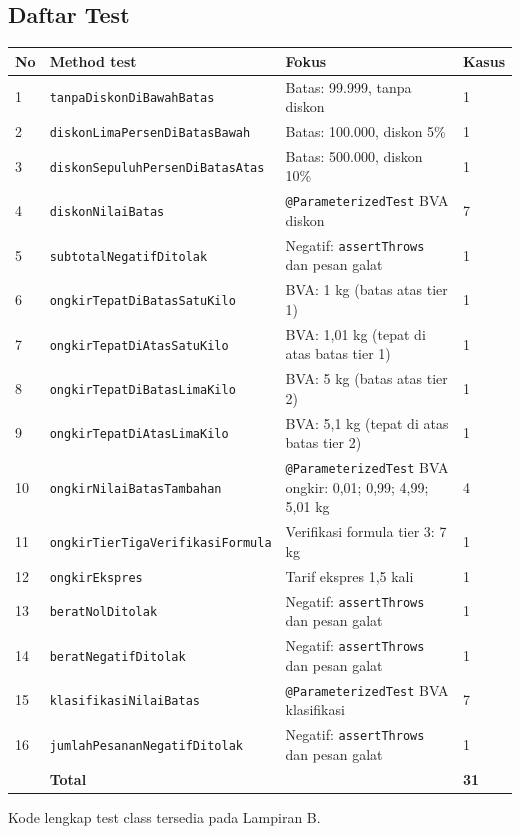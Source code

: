 \documentclass[11pt,a4paper]{article}
\newcommand{\hrow}{\rowcolor{headrow}}
\begin{document}
\subsection{Daftar Test}
\begin{center}
\small
\begin{tabularx}{\textwidth}{@{}P{0.8cm}P{5.7cm}YP{1.2cm}@{}}
\toprule
\hrow \textbf{No} & \textbf{Method test} & \textbf{Fokus} & \textbf{Kasus} \\
 & \texttt{tanpaDiskonDiBawahBatas} & Batas: 99.999, tanpa diskon & 1 \\
2 & \texttt{diskonLimaPersenDiBatasBawah} & Batas: 100.000, diskon 5\% & 1 \\
3 & \texttt{diskonSepuluhPersenDiBatasAtas} & Batas: 500.000, diskon 10\% & 1 \\
4 & \texttt{diskonNilaiBatas} & \texttt{@ParameterizedTest} BVA diskon & 7 \\
5 & \texttt{subtotalNegatifDitolak} & Negatif: \texttt{assertThrows} dan pesan galat & 1 \\
6 & \texttt{ongkirTepatDiBatasSatuKilo} & BVA: 1 kg (batas atas tier 1) & 1 \\
7 & \texttt{ongkirTepatDiAtasSatuKilo} & BVA: 1,01 kg (tepat di atas batas tier 1) & 1 \\
8 & \texttt{ongkirTepatDiBatasLimaKilo} & BVA: 5 kg (batas atas tier 2) & 1 \\
9 & \texttt{ongkirTepatDiAtasLimaKilo} & BVA: 5,1 kg (tepat di atas batas tier 2) & 1 \\
10 & \texttt{ongkirNilaiBatasTambahan} & \texttt{@ParameterizedTest} BVA ongkir: 0,01; 0,99; 4,99; 5,01 kg & 4 \\
11 & \texttt{ongkirTierTigaVerifikasiFormula} & Verifikasi formula tier 3: 7 kg & 1 \\
12 & \texttt{ongkirEkspres} & Tarif ekspres 1,5 kali & 1 \\
13 & \texttt{beratNolDitolak} & Negatif: \texttt{assertThrows} dan pesan galat & 1 \\
14 & \texttt{beratNegatifDitolak} & Negatif: \texttt{assertThrows} dan pesan galat & 1 \\
15 & \texttt{klasifikasiNilaiBatas} & \texttt{@ParameterizedTest} BVA klasifikasi & 7 \\
16 & \texttt{jumlahPesananNegatifDitolak} & Negatif: \texttt{assertThrows} dan pesan galat & 1 \\
\midrule
 & \textbf{Total} & & \textbf{31} \\
\bottomrule
\end{tabularx}
\end{center}
Kode lengkap test class tersedia pada Lampiran B.
\end{document}
